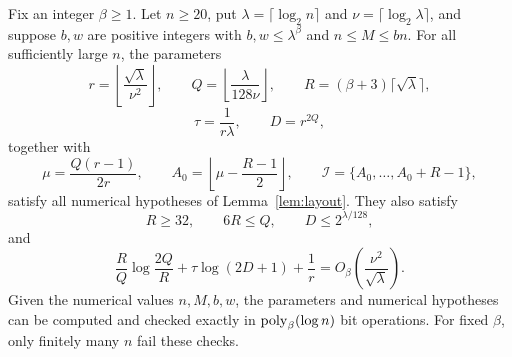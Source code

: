 \begin{lemma}\label{lem:incidence-parameters}
Fix an integer $\beta\ge1$. Let $n\ge20$, put
$\lambda=\lceil\log_2 n\rceil$ and $\nu=\lceil\log_2\lambda\rceil$,
and suppose $b,w$ are positive integers with
$b,w\le\lambda^\beta$ and $n\le M\le bn$.
For all sufficiently large $n$, the parameters
\begin{equation}\label{eq:parameter-QR}
 r=\left\lfloor\frac{\sqrt\lambda}{\nu^2}\right\rfloor,
 \qquad Q=\left\lfloor\frac{\lambda}{128\nu}\right\rfloor,
 \qquad R=(\beta+3)\lceil\sqrt\lambda\rceil,
\end{equation}
\[
 \tau=\frac1{r\lambda},\qquad
 D=r^{2Q},
\]
together with
\[
 \mu=\frac{Q(r-1)}{2r},\qquad
 A_0=\left\lfloor\mu-\frac{R-1}{2}\right\rfloor,\qquad
 \mathcal I=\{A_0,\ldots,A_0+R-1\},
\]
satisfy all numerical hypotheses of Lemma~\ref{lem:layout}. They also satisfy
\[
 R\ge32,\qquad 6R\le Q,\qquad D\le2^{\lambda/128},
\]
and
\begin{equation}\label{eq:balanced-cost}
 \frac RQ\log\frac{2Q}{R}+\tau\log(2D+1)+\frac1r
 =O_\beta\!\left(\frac{\nu^2}{\sqrt\lambda}\right).
\end{equation}
Given the numerical values $n,M,b,w$, the parameters and numerical
hypotheses can be computed and checked exactly in
$\operatorname{poly}_\beta(\log n)$ bit operations. For fixed $\beta$, only finitely
many $n$ fail these checks.
\end{lemma}
